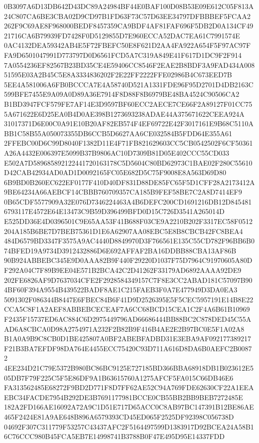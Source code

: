 \documentclass[UTF8,fontset=fandol,zihao=-4,a4paper]{ctexart}
\begin{document}
{{0B3097A6D13DB642D43DC89A24984BF44E0BAF100D08B53E09E612C05F813A24C807CA6BE3CBA02D9CD97B1FD63F73C57D63EE34797DFBBBEF5FCAA2
262F9C69AE8F968000BEDF8457359CA9BDF4AF81FAF696F5DB2D0A134CF4921716CA6B79939FD7428F0D5129855D7E960ECCA52DAC7EA61C7991574E
0AC4132DEA59342AB4E5F72FBEFC50E8F621D2AA4FA922A654F5F97AC97FFA9D6501047991D773797D0D6561FCD5A7C319A849E41F617D1DC9F2F914
7A0554236EF82567B23BD35CE4E59406CC8546F2EAE2B8BDF3A9FAD434A00851595E03A2B45C5E8A3334836202F2E22FF2222FFE02986B4C673EED7B
5EE4A581006A6FB0BCCCA7E4A58740D521A1331FDE96F95D2701D4DB2163C599BFE7455E9A09A0D89A36E7914F8D88F8B6979BE48BA4524C90506CA2
B1BD3947FCF579FE7AF14E3D9597BF60ECC2AECE7CE66F2A89127F01CC755A671622E6D25EA0B4D0AE398B1273693238ADAE44A375671622CEEA924A
31017371D6E00C0A91E10B20AF82EB574F4EF69722E42F3017161E9B68C5110ABB1C58B55A050073355DB6CCB5D6627AA6CE032584B5FDD64E355A61
2FFEBC00D6C99D8040F1382D11E4F71FB821629603CC5CB0542502F6CF50361A26A4432E006397E5099B37B9806AC10D7309B81D05E402CCC55CD033
E502A7D589685892122441720163178C5D5604C80BD62973C1BAE02F280C55610D42CAB42934AD0AD1D0092165FC05E682D5C75F9008E8A563D69D80
6B9BD0B260EC622EF0177F410D40DF831D88DE85FC65F5D1CFF28A2173412A9BE64234A66AEBCF14CBBB760709357CA185B9FEF58BE7C2A8D7414EF9
0B65CDF5577909A32E076D7346224463A4B6DEFC200CD1691216DB12D8454816793117E4572E64E13473C9B59D396499BFD0D15C726D3541A265014D
E525DD36E4D0396501C9E65AA53F41B688F03CE9A2210B202F3317EC58F0512204A185B6BE7D7BEB75361D1E6A62907AA08EBC5E8B8CBCB42FC8BEA4
484D6579BD3347F3575A9AC4440D8849970D3F766561E135C55CD782F96BB6B074BFED19A9734D3912432886D6E692AFFAF2BA16DDBB88CBA13AF86B
90B924ABBEBC345E9D0AAA82B9F440F29220D1037F75D7964C91970605A80DF292A04C7F89B9EE04E571B2BCA42C2D41262F33179AD6892AAAA92DE9
202FE6826AF9D7637034CFE2F2928584349157C7F8E3CC2ABAD181C57097B904BF60F394A9554B439522BADF8AE1C215FAEB3F0A7E477949D3DA0EA3
5091302F086344B8447E6FBEC84B6F41D9D2526395E5F5CEC5957191E14B8E22CCA5C8F1A2AEF8ABBEBCECEAF7A6CC68BCD15CEA1C2F4A6B61B10969
F2435F15737ED6AC884C6D2975449796AD66686444BB88BC2C878DED45C55AAD6A8CBCA0D98A2754971A232F2B82B9F416B4AE2E2B97BC0E5F1A02A8
B1A0A9B9C8CB0D1BE425807A0BF2ABEBFADBD31E3EBA9AF092177389217F21B3BA7EFDF98DA764E4455ECC75420C93D711A616D8DA6B0AEFC2B00872
4EE234D21C79E5372B980BC86BC9125E727185BD366BBA68918DB1B023612E505DB7F79F225C5F5E86DF9A1B63615760A1275AFCF5FA015C66DB46E6
FA313562485E68272F9BD2D771F8D7FF62AE52C94A769FDE62630CF22A1EEAEBC34FACDE7954B292DE3B7691177981BCCE0CB55BB2BB9BEB7272485E
182A2FD166AE16092A72A9C1D51E717D65ACC0C8AB97BC147391B12BE86AE465F2424E81A9AE648B896A6579393CD45ED065F2525DF92398C056738D
04692F307C311779F53257C43437AFC2F5164497599D1383917D92BCEA24A58B16C76CCC980B45FCA5EB7E14998741B3788B0F47E495D95E14337FDD
}}
\end{document}
